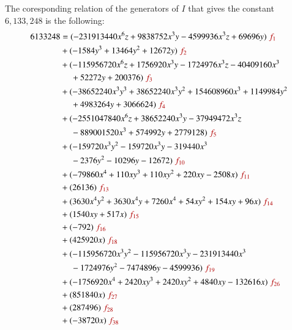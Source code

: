 The coresponding relation of the generators of $I$ that gives the constant
$6,133,248$ is the following:
\small
\begin{align*}
6133248  &= (-231913440x^6z+9838752x^3y-4599936x^3z+69696y) \;
\color{red!70!black}{f_{1}} \\
 &+ {(-1584y^3+13464y^2+12672}y)\; \color{red!70!black}{f_{2}}\\ 
 &+ (-{115956720}x^6z+{1756920}x^3y-{1724976}x^3z-{40409160}x^3\\
 &\phantom{+ (\;}+ {52272}y+{200376})\; \color{red!70!black}{{ f_{3}}}\\ 
 & + (-38652240x^3y^3+38652240x^3y^2+{154608960}x^3+{1149984}y^2\\
 &\phantom{+ (\;}+{4983264}y+{3066624})\; \color{red!70!black}{{ f_{4}}}\\ 
 & + (-{2551047840}x^6z+{38652240}x^3y-{37949472}x^3z\\
 &\phantom{+ (\;}-{889001520}x^3+{574992}y+{2779128}) \; \color{red!70!black}{{
 f_{5}}}\\ 
 & + (-{159720}x^3y^2-{159720}x^3y-{319440}x^3\\
 &\phantom{+ (\;}-{2376}y^2-{10296}y
 -{12672}){\color{red!70!black}\; f_{10}}\\ 
 & + {{(-{79860}x^4+{110}xy^3+{110}xy^2+{220}xy-{2508}x)}}\;
 \color{red!70!black}{{ f_{11}}}\\ 
 & + {{({26136})}}\; \color{red!70!black}{{ f_{13}}}\\ 
 & + {{({3630}x^4y^2+{3630}x^4y+{7260}x^4+{54}xy^2+{154}xy+{96}x)}}\;
 \color{red!70!black}{{ f_{14}}}\\ 
 & + {{({1540}xy+{517}x)}}\; \color{red!70!black}{{ f_{15}}}\\ 
 & + {{(-{792})}}\; \color{red!70!black}{{ f_{16}}}\\ 
 & + {{({425920}x)}}\; \color{red!70!black}{{ f_{18}}}\\ 
 & + (-{115956720}x^3y^2-{115956720}x^3y-{231913440}x^3\\
 &\phantom{+ (\;}-{1724976}y^2-
 {7474896}y-{4599936})\; \color{red!70!black}{ { f_{19}}}\\ 
 & + {{(-{1756920}x^4+{2420}xy^3+{2420}xy^2+{4840}xy-{132616}x)}}\;
 \color{red!70!black}{{ f_{26}}}\\ 
 & + {{({851840}x)}}\; \color{red!70!black}{{ f_{27}}}\\ 
 & + {{({287496})}}\; \color{red!70!black}{{ f_{28}}} \\
 & +  {{(-{38720}x)}}\; \color{red!70!black}{{ f_{38}}}
 \end{align*}
